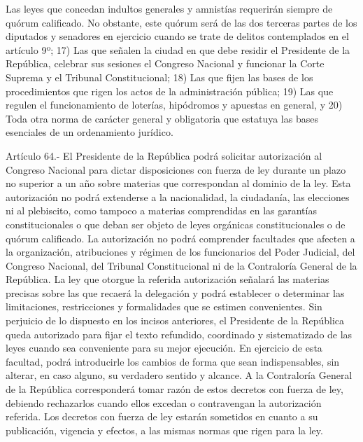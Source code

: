     Las leyes que concedan indultos generales y amnistías requerirán siempre de quórum calificado. No obstante, este quórum será de las dos terceras partes de los diputados y senadores en ejercicio cuando se trate de delitos contemplados en el artículo 9º;
    17) Las que señalen la ciudad en que debe residir el Presidente de la República, celebrar sus sesiones el Congreso Nacional y funcionar la Corte Suprema y el Tribunal Constitucional;
    18) Las que fijen las bases de los procedimientos que rigen los actos de la administración pública;
    19) Las que regulen el funcionamiento de loterías, hipódromos y apuestas en general, y
    20) Toda otra norma de carácter general y obligatoria que estatuya las bases esenciales de un ordenamiento jurídico.



    Artículo 64.- El Presidente de la República podrá solicitar autorización al Congreso Nacional para dictar disposiciones con fuerza de ley durante un plazo no superior a un año sobre materias que correspondan al dominio de la ley.
    Esta autorización no podrá extenderse a la nacionalidad, la ciudadanía, las elecciones ni al plebiscito, como tampoco a materias comprendidas en las garantías constitucionales o que deban ser objeto de leyes orgánicas constitucionales o de quórum calificado.
    La autorización no podrá comprender facultades que afecten a la organización, atribuciones y régimen de los funcionarios del Poder Judicial, del Congreso Nacional, del Tribunal Constitucional ni de la Contraloría General de la República.
    La ley que otorgue la referida autorización señalará las materias precisas sobre las que recaerá la delegación y podrá establecer o determinar las limitaciones, restricciones y formalidades que se estimen convenientes.
    Sin perjuicio de lo dispuesto en los incisos anteriores, el Presidente de la República queda autorizado para fijar el texto refundido, coordinado y sistematizado de las leyes cuando sea conveniente para su mejor ejecución. En ejercicio de esta facultad, podrá introducirle los cambios de forma que sean indispensables, sin alterar, en caso alguno, su verdadero sentido y alcance.
    A la Contraloría General de la República corresponderá tomar razón de estos decretos con fuerza de ley, debiendo rechazarlos cuando ellos excedan o contravengan la autorización referida.
    Los decretos con fuerza de ley estarán sometidos en cuanto a su publicación, vigencia y efectos, a las mismas normas que rigen para la ley.




